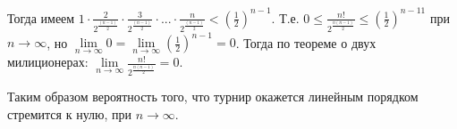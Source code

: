\documentclass{article}
\newcommand{\half}[1]{\frac{#1}{2}}
\begin{document}
	Тогда имеем $1 \cdot \frac {2}{2^{\half{(n - 1)}}} \cdot \frac {3}{2^{\half{(n - 1)}}} \cdot ... \cdot \frac{n} {2^{\half{(n - 1)}}} < (\half{1})^{n - 1}$. Т.е. $0 \leqslant \frac{n!}{2^{\half{n(n - 1)}}} \leqslant (\half{1})^{n - 11}$ при $n \rightarrow \infty$, но $\lim\limits_{n \rightarrow \infty}0 = \lim\limits_{n \rightarrow \infty}  (\half{1})^{n - 1} = 0$. Тогда по теореме о двух милиционерах: $\lim\limits_{n \rightarrow \infty} \frac{n!}{2^{\half{n(n - 1)}}} = 0$.
	
	Таким образом вероятность того, что турнир окажется линейным порядком стремится к нулю, при $n \rightarrow \infty$.
 
\end{document}
